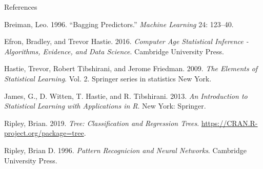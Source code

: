 \documentclass[10pt,ignorenonframetext,]{beamer}
\begin{document}
\begin{frame}{References}

\tiny

\hypertarget{refs}{}
\hypertarget{ref-Breiman1996}{}
Breiman, Leo. 1996. ``Bagging Predictors.'' \emph{Machine Learning} 24:
123--40.

\hypertarget{ref-Efron_Hastie2016}{}
Efron, Bradley, and Trevor Hastie. 2016. \emph{Computer Age Statistical
Inference - Algorithms, Evidence, and Data Science}. Cambridge
University Press.

\hypertarget{ref-hastie_etal2009}{}
Hastie, Trevor, Robert Tibshirani, and Jerome Friedman. 2009. \emph{The
Elements of Statistical Learning}. Vol. 2. Springer series in statistics
New York.

\hypertarget{ref-james.etal}{}
James, G., D. Witten, T. Hastie, and R. Tibshirani. 2013. \emph{An
Introduction to Statistical Learning with Applications in R}. New York:
Springer.

\hypertarget{ref-tree2019}{}
Ripley, Brian. 2019. \emph{Tree: Classification and Regression Trees}.
\url{https://CRAN.R-project.org/package=tree}.

\hypertarget{ref-Ripley}{}
Ripley, Brian D. 1996. \emph{Pattern Recognicion and Neural Networks}.
Cambridge University Press.

\end{frame}
\end{document}
